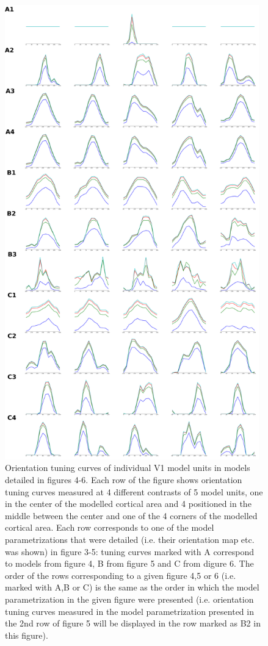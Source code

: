 \documentclass[utf8]{frontiersSCNS}
\begin{document}
\begin{figure}[htpb!] 
\centering
\includegraphics[width=11cm]{./SVG/Figure5/figure5.png}
\caption{Orientation tuning curves of individual V1 model units in models detailed in figures 4-6. Each row of the figure shows orientation tuning curves measured at 4 different contrasts of 5 model units, one in the center of the modelled cortical area and 4 positioned in the middle between the center and one of the 4 corners of the modelled cortical area. Each row corresponds to one of the model parametrizations that were detailed (i.e. their orientation map etc. was shown) in figure 3-5: tuning curves marked with A correspond to models from figure 4, B from figure 5 and C from digure 6.
The order of the rows corresponding to a given figure 4,5 or 6 (i.e. marked with A,B or C) is the same as the order in which the model parametrization
in the given figure were presented (i.e. orientation tuning curves measured in the model parametrization presented in the 2nd row of figure 5 will be displayed in the row marked as B2 in this figure).}
\label{fig:figure5}
\end{figure} 
\end{document}
